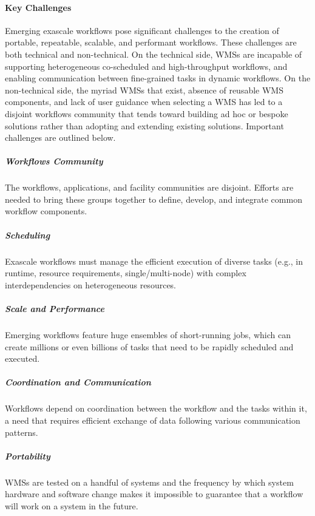 \paragraph{Key Challenges}
Emerging exascale workflows pose significant challenges to the creation of
portable, repeatable, scalable, and performant workflows. These challenges are both
technical and non-technical. On the technical side, WMSs are 
incapable of supporting heterogeneous co-scheduled and
high-throughput workflows, and enabling communication between fine-grained
tasks in dynamic workflows. On the non-technical side, the myriad WMSs
that exist, absence of reusable WMS components, and lack of user
guidance when selecting a WMS has led to a disjoint workflows community
that tends toward building ad hoc or bespoke solutions rather than adopting
and extending existing solutions. Important challenges are outlined below. 

    \subparagraph{Workflows Community} The workflows, applications, and facility communities are disjoint. 
    Efforts are needed to bring these groups together to define, develop, and integrate common workflow components. %
    \subparagraph{Scheduling} Exascale workflows must manage the efficient execution of diverse
    tasks (e.g., in runtime, resource requirements, single/multi-node) with complex interdependencies on heterogeneous resources. 
    \subparagraph{Scale and Performance} Emerging workflows feature huge ensembles of short-running jobs, 
    which can create millions or even billions of tasks that need to be rapidly scheduled and executed.
    \subparagraph{Coordination and Communication} Workflows depend on coordination between the workflow and 
    the tasks within it, a need that requires efficient exchange of data following various communication patterns.
    \subparagraph{Portability} WMSs are tested on a handful of systems and the frequency by which
    system hardware and software change makes it impossible to guarantee that a workflow will work on a system in the future.




